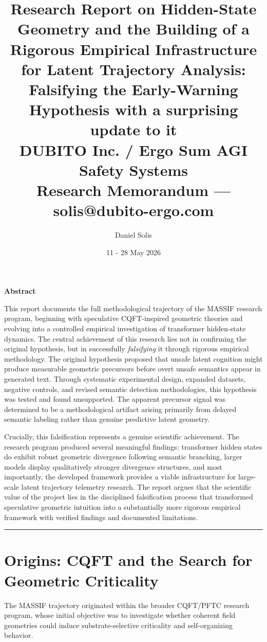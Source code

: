 \documentclass[12pt,a4paper]{article}
\title{\textbf{Research Report on Hidden-State Geometry and the Building of a Rigorous Empirical Infrastructure for Latent Trajectory Analysis: Falsifying the Early-Warning Hypothesis with a surprising update to it}\\[1em]
\large DUBITO Inc. / Ergo Sum AGI Safety Systems\\
\small Research Memorandum --- solis@dubito-ergo.com}
\author{Daniel Solis}
\date{11 - 28 May 2026}
\begin{document}
\maketitle

\begin{center}
\vspace*{2em}
\textbf{Abstract}
\end{center}

\noindent
This report documents the full methodological trajectory of the MASSIF research program, beginning with speculative CQFT-inspired geometric theories and evolving into a controlled empirical investigation of transformer hidden-state dynamics. The central achievement of this research lies not in confirming the original hypothesis, but in successfully \emph{falsifying} it through rigorous empirical methodology. The original hypothesis proposed that unsafe latent cognition might produce measurable geometric precursors before overt unsafe semantics appear in generated text. Through systematic experimental design, expanded datasets, negative controls, and revised semantic detection methodologies, this hypothesis was tested and found unsupported. The apparent precursor signal was determined to be a methodological artifact arising primarily from delayed semantic labeling rather than genuine predictive latent geometry.

Crucially, this falsification represents a genuine scientific achievement. The research program produced several meaningful findings: transformer hidden states do exhibit robust geometric divergence following semantic branching, larger models display qualitatively stronger divergence structures, and most importantly, the developed framework provides a viable infrastructure for large-scale latent trajectory telemetry research. The report argues that the scientific value of the project lies in the disciplined falsification process that transformed speculative geometric intuition into a substantially more rigorous empirical framework with verified findings and documented limitations.

\medskip
\hrule
\medskip

\section{Origins: CQFT and the Search for Geometric Criticality}

The MASSIF trajectory originated within the broader CQFT/PFTC research program, whose initial objective was to investigate whether coherent field geometries could induce substrate-selective criticality and self-organizing behavior.
\end{document}
